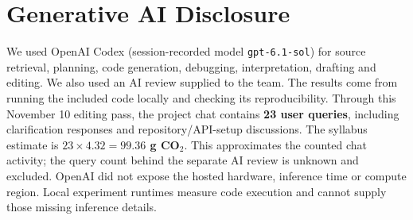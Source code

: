 \documentclass[11pt]{article}
\begin{document}
\section*{Generative AI Disclosure}

We used OpenAI Codex (session-recorded model \texttt{gpt-6.1-sol}) for source retrieval, planning, code generation, debugging, interpretation, drafting and editing. We also used an AI review supplied to the team. The results come from running the included code locally and checking its reproducibility. Through this November 10 editing pass, the project chat contains \textbf{23 user queries}, including clarification responses and repository/API-setup discussions. The syllabus estimate is \textbf{$23\times4.32=99.36$ g CO$_2$}. This approximates the counted chat activity; the query count behind the separate AI review is unknown and excluded. OpenAI did not expose the hosted hardware, inference time or compute region. Local experiment runtimes measure code execution and cannot supply those missing inference details.


\end{document}
